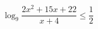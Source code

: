 \begin{ex}[type=inequality]
	\begin{condition}
	\( \log_9\dfrac{2x^2+15x+22}{x+4}\le\dfrac{1}{2} \)
	\end{condition}
	\answer{\( (-5,5;-5]\cup(-2;-1] \)}
\end{ex}